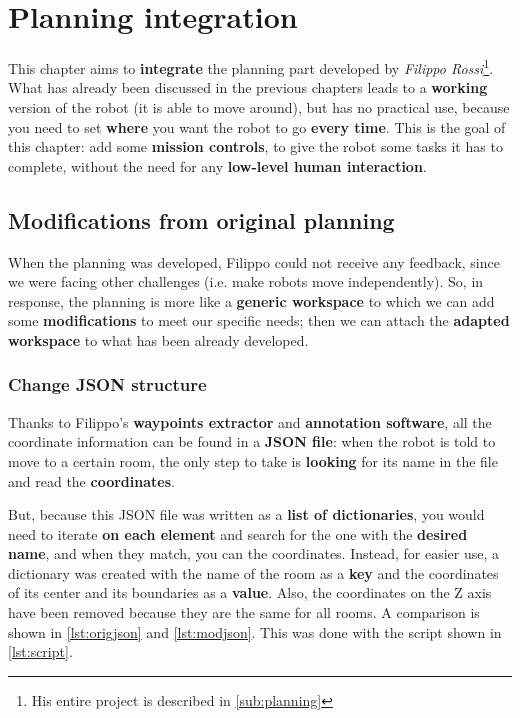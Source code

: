 \chapter{Planning integration} %
\label{cha:planningbridge}

This chapter aims to \textbf{integrate} the planning part developed by \textit{Filippo Rossi}\footnote{His entire project is described in \autoref{sub:planning}}\cite{fr}. What has already been discussed in the previous chapters leads to a \textbf{working} version of the robot (it is able to move around), but has no practical use, because you need to set \textbf{where} you want the robot to go \textbf{every time}. This is the goal of this chapter: add some \textbf{mission controls}, to give the robot some tasks it has to complete, without the need for any \textbf{low-level human interaction}.

\section{Modifications from original planning}

When the planning was developed, Filippo could not receive any feedback, since we were facing other challenges (i.e. make robots move independently). So, in response, the planning is more like a \textbf{generic workspace} to which we can add some \textbf{modifications} to meet our specific needs; then we can attach the \textbf{adapted workspace} to what has been already developed.


\subsection{Change JSON structure}
\label{sub:json}

Thanks to Filippo's \textbf{waypoints extractor} and  \textbf{annotation software}, all the coordinate information can be found in a \textbf{JSON file}: when the robot is told to move to a certain room, the only step to take is \textbf{looking} for its name in the file and read the \textbf{coordinates}.

But, because this JSON file was written as a \textbf{list of dictionaries}, you would need to iterate \textbf{on each element} and search for the one with the \textbf{desired name}, and when they match, you can the coordinates. Instead, for easier use, a dictionary was created with the name of the room as a \textbf{key} and the coordinates of its center and its boundaries as a \textbf{value}. Also, the coordinates on the Z axis have been removed because they are the same for all rooms. A comparison is shown in \autoref{lst:origjson} and \autoref{lst:modjson}. This was done with the  script shown in \autoref{lst:script}.

